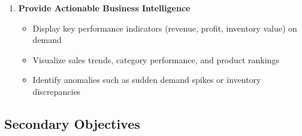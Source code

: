 \begin{enumerate}[leftmargin=*]
    \item \textbf{Provide Actionable Business Intelligence}
    \begin{itemize}
        \item Display key performance indicators (revenue, profit, inventory value) on demand
        \item Visualize sales trends, category performance, and product rankings
        \item Identify anomalies such as sudden demand spikes or inventory discrepancies
    \end{itemize}
\end{enumerate}

\subsection{Secondary Objectives}

